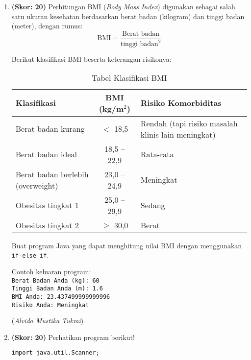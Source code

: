 \documentclass{article}
\begin{document}
\begin{enumerate}
    \item \textbf{(Skor: 20)} Perhitungan BMI (\textit{Body Mass Index}) digunakan sebagai salah satu ukuran kesehatan berdasarkan berat badan (kilogram) dan tinggi badan (meter), dengan rumus:
    \[
    \text{BMI} = \frac{\text{Berat badan}}{\text{tinggi badan}^2}
    \]
    
    Berikut klasifikasi BMI beserta keterangan risikonya:
    \begin{table}[h!]
        \centering
        \begin{tabular}{|m{3.5cm}|c|m{4.5cm}|}
            \hline
            \rowcolor{input}
            \textbf{Klasifikasi} & \textbf{BMI (kg/m\(^2\))} & \textbf{Risiko Komorbiditas} \\
            \hline
            \raggedright Berat badan kurang & $<$ 18,5 & Rendah (tapi risiko masalah klinis lain meningkat) \\
            \hline
            \raggedright Berat badan ideal & 18,5 -- 22,9 & Rata-rata \\
            \hline
            \raggedright Berat badan berlebih (overweight) & 23,0 -- 24,9 & Meningkat \\
            \hline
            Obesitas tingkat 1 & 25,0 -- 29,9 & Sedang \\
            \hline
            Obesitas tingkat 2 & $\geq$ 30,0 & Berat \\
            \hline
        \end{tabular}
        \caption{Tabel Klasifikasi BMI}
    \end{table}

    Buat program Java yang dapat menghitung nilai BMI dengan menggunakan \texttt{if-else if}.
    
    Contoh keluaran program:\\
    \texttt{Berat Badan Anda (kg): 60} \\
    \texttt{Tinggi Badan Anda (m): 1.6} \\
    \texttt{BMI Anda: 23.437499999999996} \\
    \texttt{Risiko Anda: Meningkat}

    \begin{flushright}
        (\textit{Alvida Mustika Tukmi})
    \end{flushright}

    \item \textbf{(Skor: 20)} Perhatikan program berikut!

    \begin{verbatim}
import java.util.Scanner;


\end{verbatim}
\end{enumerate}
\end{document}
